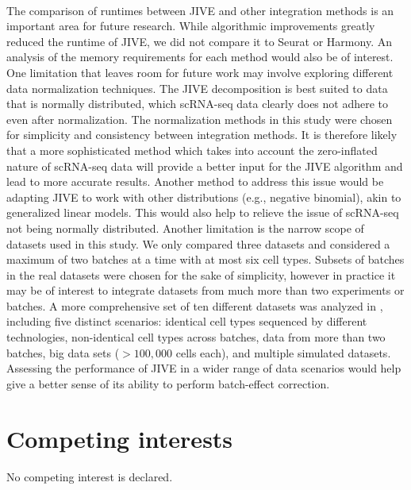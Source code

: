 \documentclass[unnumsec,webpdf,contemporary,large]{oup-authoring-template}%
\theoremstyle{thmstyleone}%
\theoremstyle{thmstyletwo}%
\theoremstyle{thmstylethree}%
\begin{document}
\paragraph*{}
The comparison of runtimes between JIVE and other integration methods is an important area for future research. While algorithmic improvements greatly reduced the runtime of JIVE, we did not compare it to Seurat or Harmony. An analysis of the memory requirements for each method would also be of interest.
One limitation that leaves room for future work may involve exploring different data normalization techniques. The JIVE decomposition is best suited to data that is normally distributed, which scRNA-seq data clearly does not adhere to even after normalization. The normalization methods in this study were chosen for simplicity and consistency between integration methods. It is therefore likely that a more sophisticated method which takes into account the zero-inflated nature of scRNA-seq data will provide a better input for the JIVE algorithm and lead to more accurate results. Another method to address this issue would be adapting JIVE to work with other distributions (e.g., negative binomial), akin to generalized linear models. This would also help to relieve the issue of scRNA-seq not being normally distributed.
Another limitation is the narrow scope of datasets used in this study. We only compared three datasets and considered a maximum of two batches at a time with at most six cell types. Subsets of batches in the real datasets were chosen for the sake of simplicity, however in practice it may be of interest to integrate datasets from much more than two experiments or batches. A more comprehensive set of ten different datasets was analyzed in \cite{tran2020benchmark}, including five distinct scenarios: identical cell types sequenced by different technologies, non-identical cell types across batches, data from more than two batches, big data sets ($>100,000$ cells each), and multiple simulated datasets. Assessing the performance of JIVE in a wider range of data scenarios would help give a better sense of its ability to perform batch-effect correction.


\begin{appendices}

\end{appendices}

\section{Competing interests}
No competing interest is declared.
\end{document}
